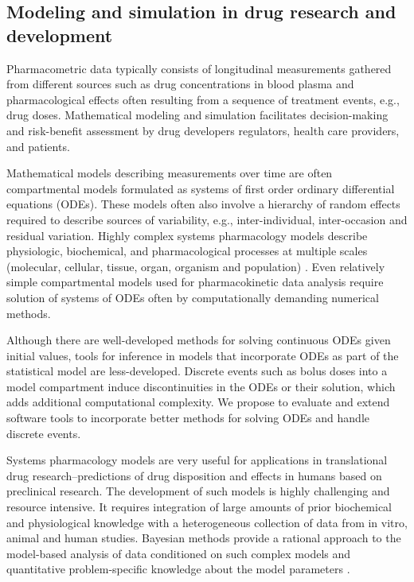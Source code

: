\documentclass[11pt]{nih2016}
\begin{document}
\subsection{Modeling and simulation in drug research and development}

Pharmacometric data typically consists of longitudinal measurements
gathered from different sources such as drug concentrations in blood
plasma and pharmacological effects often resulting from a sequence of
treatment events, e.g., drug doses. Mathematical modeling and
simulation facilitates decision-making and risk-benefit assessment by
drug developers regulators, health care providers, and patients.

Mathematical models describing measurements over time are often
compartmental models formulated as systems of first order ordinary
differential equations (ODEs). These models often also involve a
hierarchy of random effects required to describe sources of
variability, e.g., inter-individual, inter-occasion and residual
variation. Highly complex systems pharmacology models describe
physiologic, biochemical, and pharmacological processes at multiple
scales (molecular, cellular, tissue, organ, organism and population)
\citep[e.g.,][]{baron-et-al:2013, peterson-rigg:2010}. Even relatively
simple compartmental models used for pharmacokinetic data analysis
require solution of systems of ODEs often by computationally demanding
numerical methods.

Although there are well-developed methods for solving continuous ODEs
given initial values, tools for inference in models that incorporate
ODEs as part of the statistical model are less-developed. Discrete
events such as bolus doses into a model compartment induce
discontinuities in the ODEs or their solution, which adds additional
computational complexity. We propose to evaluate and extend software
tools to incorporate better methods for solving ODEs and handle
discrete events.

Systems pharmacology models are very useful for applications in
translational drug research--predictions of drug disposition and
effects in humans based on preclinical research. The development of
such models is highly challenging and resource intensive. It requires
integration of large amounts of prior biochemical and physiological
knowledge with a heterogeneous collection of data from in vitro,
animal and human studies. Bayesian methods provide a rational approach
to the model-based analysis of data conditioned on such complex models
and quantitative problem-specific knowledge about the model parameters
\citep[e.g.,][]{gelman-et-al:1996, leclerc-et-al:2016}.
\end{document}
